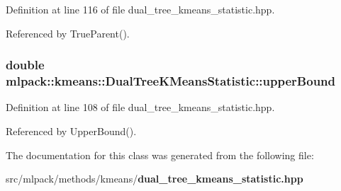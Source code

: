 Definition at line 116 of file dual\+\_\+tree\+\_\+kmeans\+\_\+statistic.\+hpp.



Referenced by True\+Parent().

\subsubsection[{upper\+Bound}]{\setlength{\rightskip}{0pt plus 5cm}double mlpack\+::kmeans\+::\+Dual\+Tree\+K\+Means\+Statistic\+::upper\+Bound\hspace{0.3cm}{\ttfamily [private]}}\label{classmlpack_1_1kmeans_1_1DualTreeKMeansStatistic_a4336c0ee76c293dabed4dcfbb9318ef6}


Definition at line 108 of file dual\+\_\+tree\+\_\+kmeans\+\_\+statistic.\+hpp.



Referenced by Upper\+Bound().



The documentation for this class was generated from the following file\+:\begin{DoxyCompactItemize}
\item 
src/mlpack/methods/kmeans/{\bf dual\+\_\+tree\+\_\+kmeans\+\_\+statistic.\+hpp}\end{DoxyCompactItemize}
